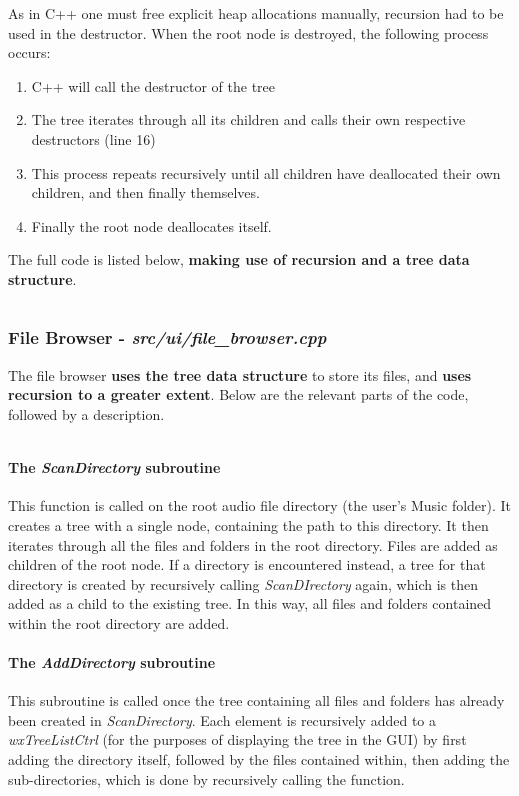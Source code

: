 As in C++ one must free explicit heap allocations manually,  recursion had to be used in the destructor. When the root node is destroyed, the following process occurs:
\begin{enumerate}
	\item C++ will call the destructor of the tree
	\item The tree iterates through all its children and calls their own respective destructors (line 16)
	\item This process repeats recursively until all children have deallocated their own children, and then finally themselves.
	\item Finally the root node deallocates itself.
\end{enumerate}
The full code is listed below, \textbf{making use of recursion and a tree data structure}.
\pagebreak
\inputminted[linenos]{c++}{../include/data/tree.h}

\pagebreak
\subsubsection{File Browser - \textit{src/ui/file\_browser.cpp}}
The file browser \textbf{uses the tree data structure} to store its files, and \textbf{uses recursion to a greater extent}. Below are the relevant parts of the code, followed by a description.

\inputminted[linenos, firstline=47, lastline=108]{c++}{../src/ui/file_browser.cpp}

\paragraph{The \textit{ScanDirectory} subroutine} This function is called on the root audio file directory (the user's Music folder). It creates a tree with a single node, containing the path to this directory. It then iterates through all the files and folders in the root directory. Files are added as children of the root node. If a directory is encountered instead, a tree for that directory is created by recursively calling \textit{ScanDIrectory} again, which is then added as a child to the existing tree. In this way, all files and folders contained within the root directory are added.  

\paragraph{The \textit{AddDirectory} subroutine} This subroutine is called once the tree containing all files and folders has already been created in \textit{ScanDirectory}. Each element is recursively added to a \textit{wxTreeListCtrl} (for the purposes of displaying the tree in the GUI) by first adding the directory itself, followed by the files contained within, then adding the sub-directories, which is done by recursively calling the function.

